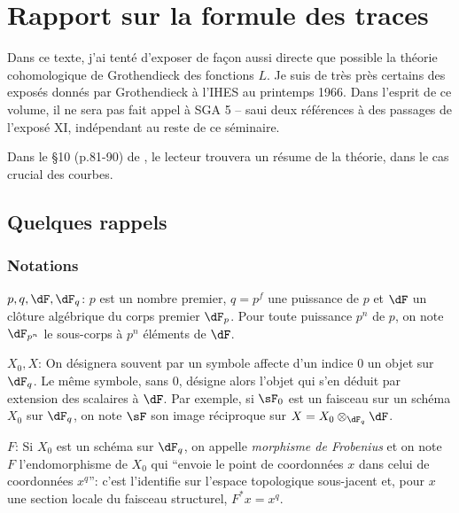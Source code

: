 
\chapter{Rapport sur la formule des traces}\label{II}

Dans ce texte, j'ai tenté d'exposer de façon aussi directe que possible la 
théorie cohomologique de Grothendieck des fonctions $L$. Je suis de très près 
certains des exposés donnés par Grothendieck à l'IHES au printemps 1966. Dans 
l'esprit de ce volume, il ne sera pas fait appel à SGA 5 -- saui deux 
références à des passages de l'exposé XI, indépendant au reste de ce 
séminaire. 

Dans le \S 10 (p.81-90) de \cite{de73}, le lecteur trouvera un résume de la 
théorie, dans le cas crucial des courbes. 










\section{Quelques rappels}\label{II:1}





\subsection{Notations}\label{II:1-1}

$p,q,\dF,\dF_q$: $p$ est un nombre premier, $q=p^f$ une puissance de $p$ et 
$\dF$ un clôture algébrique du corps premier $\dF_p$. Pour toute puissance 
$p^n$ de $p$, on note $\dF_{p^n}$ le sous-corps à $p^n$ éléments de $\dF$. 

$X_0,X$: On désignera souvent par un symbole affecte d'un indice $0$ un objet 
sur $\dF_q$. Le même symbole, sans $0$, désigne alors l'objet qui s'en déduit 
par extension des scalaires à $\dF$. Par exemple, si $\sF_0$ est un faisceau 
sur un schéma $X_0$ sur $\dF_q$, on note $\sF$ son image réciproque sur 
$X=X_0\otimes_{\dF_q} \dF$. 

$F$: Si $X_0$ est un schéma sur $\dF_q$, on appelle \emph{morphisme de 
Frobenius} et on note $F$ l'endomorphisme de $X_0$ qui ``envoie le point de 
coordonnées $x$ dans celui de coordonnées $x^q$'': c'est l'identifie sur 
l'espace topologique sous-jacent et, pour $x$ une section locale du faisceau 
structurel, $F^* x = x^q$. 


